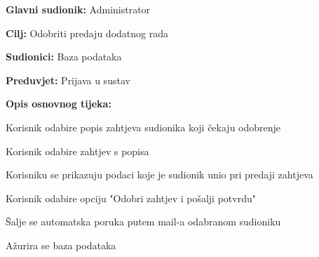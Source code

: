 					\noindent {}
					\begin{packed_item}
	
						\item \textbf{Glavni sudionik: } Administrator
						\item  \textbf{Cilj:} Odobriti predaju dodatnog rada
						\item  \textbf{Sudionici:} Baza podataka
						\item  \textbf{Preduvjet:} Prijava u sustav
						\item  \textbf{Opis osnovnog tijeka:}
						
						\item[] \begin{packed_enum}
	
							\item Korisnik odabire popis zahtjeva sudionika koji čekaju odobrenje
							\item Korisnik odabire zahtjev s popisa
							\item Korisniku se prikazuju podaci koje je sudionik unio pri predaji zahtjeva
							\item Korisnik odabire opciju "Odobri zahtjev i pošalji potvrdu"
							\item Šalje se automatska poruka putem mail-a odabranom sudioniku
							\item Ažurira se baza podataka

					
						\end{packed_enum}
			
					\end{packed_item}

